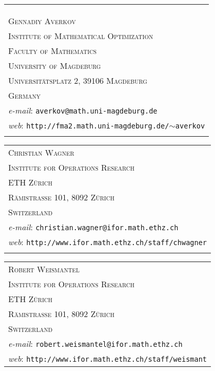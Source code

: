 \documentclass[a4paper]{article}
\theoremstyle{plain}
\begin{document}
\begin{tabular}{l}
  \\
  \\
  \\
  \\
  \textsc{Gennadiy Averkov} \\
  \textsc{Institute of Mathematical Optimization} \\
  \textsc{Faculty of Mathematics} \\
  \textsc{University of Magdeburg} \\
  \textsc{Universit\"atsplatz 2, 39106 Magdeburg} \\
  \textsc{Germany}        \\
  \emph{e-mail}: \texttt{averkov@math.uni-magdeburg.de} \\
  \emph{web}: \texttt{http://fma2.math.uni-magdeburg.de/$\sim$averkov}
  \\ \\
\end{tabular} 

\begin{tabular}{l}
  \textsc{Christian Wagner} \\
  \textsc{Institute for Operations Research} \\
  \textsc{ETH Z\"urich} \\
  \textsc{R\"amistrasse 101, 8092 Z\"urich} \\
  \textsc{Switzerland}        \\
  \emph{e-mail}: \texttt{christian.wagner@ifor.math.ethz.ch} \\
  \emph{web}:
  \texttt{http://www.ifor.math.ethz.ch/staff/chwagner}
  \\ \\
\end{tabular}

\begin{tabular}{l}
  \textsc{Robert Weismantel} \\
  \textsc{Institute for Operations Research} \\
  \textsc{ETH Z\"urich} \\
  \textsc{R\"amistrasse 101, 8092 Z\"urich} \\
  \textsc{Switzerland}        \\
  \emph{e-mail}: \texttt{robert.weismantel@ifor.math.ethz.ch} \\
  \emph{web}: \texttt{http://www.ifor.math.ethz.ch/staff/weismant}
\end{tabular}
\end{document}
